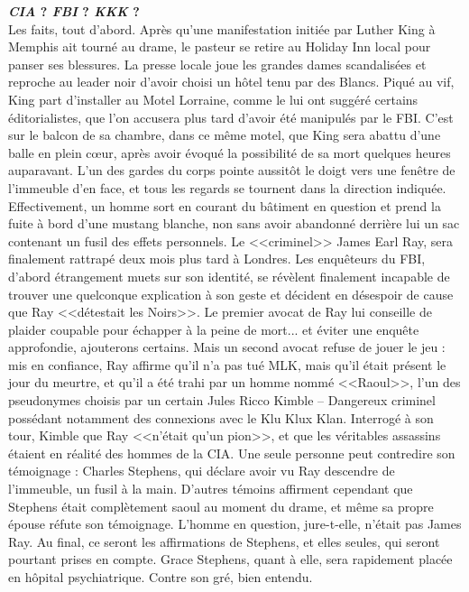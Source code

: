 \documentclass[11pt,twoside,a4paper]{article}
\begin{document}
\begin{multicols*}{2}
\vfill
\columnbreak

\textbf{\large \emph{CIA} ? \emph{FBI} ? \emph{KKK} ? }~\\
Les faits, tout d'abord. Apr{\`e}s qu'une manifestation initi{\'e}e par Luther King {\`a} Memphis ait tourn{\'e} au drame, le pasteur se retire au Holiday Inn local pour panser ses blessures. La presse locale joue les grandes dames scandalis{\'e}es et reproche au leader noir d'avoir choisi un h{\^o}tel tenu par des Blancs. Piqu{\'e} au vif, King part d'installer au Motel Lorraine, comme le lui ont sugg{\'e}r{\'e} certains {\'e}ditorialistes, que l'on accusera plus tard d'avoir {\'e}t{\'e} manipul{\'e}s par le FBI. C'est sur le balcon de sa chambre, dans ce m{\^e}me motel, que King sera abattu d'une balle en plein c\oe ur, apr{\`e}s avoir {\'e}voqu{\'e} la possibilit{\'e} de sa mort quelques heures auparavant. L'un des gardes du corps pointe aussit{\^o}t le doigt vers une fen{\^e}tre de l'immeuble d'en face, et tous les regards se tournent dans la direction indiqu{\'e}e. Effectivement, un homme sort en courant du b{\^a}timent en question et prend la fuite {\`a} bord d'une mustang blanche, non sans avoir abandonn{\'e} derri{\`e}re lui un sac contenant un fusil des effets personnels. Le <<criminel>> James Earl Ray, sera finalement rattrap{\'e} deux mois plus tard {\`a} Londres. Les enqu{\^e}teurs du FBI, d'abord {\'e}trangement muets sur son identit{\'e}, se r{\'e}v{\`e}lent finalement incapable de trouver une quelconque explication {\`a} son geste et d{\'e}cident en d{\'e}sespoir de cause que Ray <<d{\'e}testait les Noirs>>. Le premier avocat de Ray lui conseille de plaider coupable pour {\'e}chapper {\`a} la peine de mort... et {\'e}viter une enqu{\^e}te approfondie, ajouterons certains. 
Mais un second avocat refuse de jouer le jeu : mis en confiance, Ray affirme qu'il n'a pas tu{\'e} MLK, mais qu'il {\'e}tait pr{\'e}sent le jour du meurtre, et qu'il a {\'e}t{\'e} trahi par un homme nomm{\'e} <<Raoul>>, l'un des pseudonymes choisis par un certain Jules Ricco Kimble – Dangereux criminel poss{\'e}dant notamment des connexions avec le Klu Klux Klan. Interrog{\'e} {\`a} son tour, Kimble que Ray <<n'{\'e}tait qu'un pion>>, et que les v{\'e}ritables assassins {\'e}taient en r{\'e}alit{\'e} des hommes de la CIA. Une seule personne peut contredire son t{\'e}moignage : Charles Stephens, qui d{\'e}clare avoir vu Ray descendre de l'immeuble, un fusil {\`a} la main. D'autres t{\'e}moins affirment cependant que Stephens {\'e}tait compl{\`e}tement saoul au moment du drame, et m{\^e}me sa propre {\'e}pouse r{\'e}fute son t{\'e}moignage. L'homme en question, jure-t-elle, n'{\'e}tait pas James Ray. Au final, ce seront les affirmations de Stephens, et elles seules, qui seront pourtant prises en compte. Grace Stephens, quant {\`a} elle, sera rapidement plac{\'e}e en h{\^o}pital psychiatrique. Contre son gr{\'e}, bien entendu. 


\end{multicols*}
\end{document}
